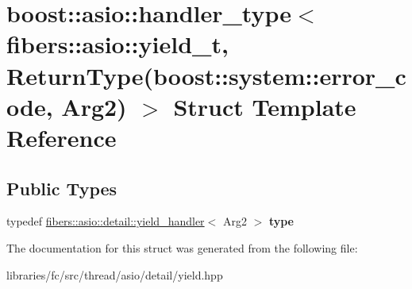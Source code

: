 \hypertarget{structboost_1_1asio_1_1handler__type_3_01fibers_1_1asio_1_1yield__t_00_01_return_type_07boost_1_dec09fad67bd9ca4754be75bf1feab34}{}\section{boost\+:\+:asio\+:\+:handler\+\_\+type$<$ fibers\+:\+:asio\+:\+:yield\+\_\+t, Return\+Type(boost\+:\+:system\+:\+:error\+\_\+code, Arg2) $>$ Struct Template Reference}
\label{structboost_1_1asio_1_1handler__type_3_01fibers_1_1asio_1_1yield__t_00_01_return_type_07boost_1_dec09fad67bd9ca4754be75bf1feab34}
\subsection*{Public Types}
\begin{DoxyCompactItemize}
\item 
\mbox{\label{structboost_1_1asio_1_1handler__type_3_01fibers_1_1asio_1_1yield__t_00_01_return_type_07boost_1_dec09fad67bd9ca4754be75bf1feab34_a56ac0940150a45481af3ff3a4f309136}} 
typedef \mbox{\hyperlink{classboost_1_1fibers_1_1asio_1_1detail_1_1yield__handler}{fibers\+::asio\+::detail\+::yield\+\_\+handler}}$<$ Arg2 $>$ {\bfseries type}
\end{DoxyCompactItemize}


The documentation for this struct was generated from the following file\+:\begin{DoxyCompactItemize}
\item 
libraries/fc/src/thread/asio/detail/yield.\+hpp\end{DoxyCompactItemize}
